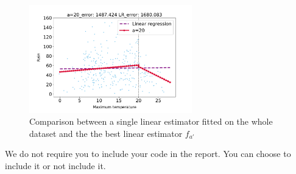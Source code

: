 \documentclass[12pt,twoside]{article}
\begin{document}
\begin{enumerate}
\begin{enumerate}
 	\begin{figure}[H]
		\centering
		\includegraphics[width=200pt]{figures/test_comparison.pdf}
		\caption{Comparison between a single linear estimator fitted on the whole dataset and the  the best linear estimator $f_{a'}$}
		\label{fig7}
	\end{figure}


 \end{enumerate}
 	
 We do not require you to include your code in the report. You can choose to include it or not include it. 
\end{enumerate}
\end{document}
